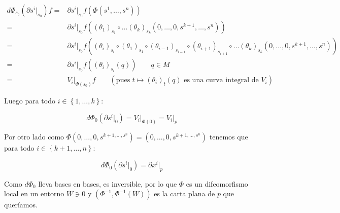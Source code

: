 \documentclass[11pt]{article}
\newcommand{\sett}[1]{\left\lbrace#1\right\rbrace}
\numberwithin{theorem}{subsection}
\newenvironment{proof}[1][Demostraci\'on]{\begin{trivlist}
		\item[\hskip \labelsep {\bfseries #1}]}{\end{trivlist}}
\newenvironment{definition}[1][Definici\'on]{\begin{trivlist}
		\item[\hskip \labelsep {\bfseries #1}]}{\end{trivlist}}
\newcommand{\qed}{\nobreak \ifvmode \relax \else
	\ifdim\lastskip<1.5em \hskip-\lastskip
	\hskip1.5em plus0em minus0.5em \fi \nobreak
	\vrule height0.75em width0.5em depth0.25em\fi}
\begin{document}
\begin{proof}
\begin{definition}
\begin{proof}
			\begin{equation*}
			\begin{aligned}
				d \Phi_{s_0} \left(\partial s^i \vert_{s_0}\right)f = & \partial s^i \vert_{s_0} f \left(\Phi(s^1, \dots, s^n)\right) \\
				= & \partial s^i \vert_{s_0} f \left((\theta_1)_{s_1} \circ \dots (\theta_k)_{s_k} (0, \dots, 0, s^{k+1}, \dots, s^n) \right) \\ 
				= & \partial s^i \vert_{s_0} f \left((\theta_i)_{s_i} \circ (\theta_1)_{s_1} \circ (\theta_{i-1})_{s_{i-1}}  \circ (\theta_{i+1})_{s_{i+1}} \circ  \dots (\theta_k)_{s_k} (0, \dots, 0, s^{k+1}, \dots, s^n) \right)  \\
				= & \partial s^i \vert_{s_0} f \left((\theta_i)_{s_i} (q) \right) \qquad q \in M \\
				= & V_i \vert_{\Phi(s_0)} f \qquad \left( \text{pues } t \mapsto (\theta_i)_t(q) \text{ es una curva integral de } V_i	\right)			
			\end{aligned}
			\end{equation*}
			
			Luego para todo $i \in \sett{1, \dots, k}$:
			
			\begin{equation}
				d \Phi_{0} \left(\partial s^i \vert_{0}\right) = V_i \vert_{\Phi(0)}  = V_i \vert_{p} 
			\end{equation}
			
			Por otro lado como $\Phi (0, \dots, 0, s^{k+1, \dots, s^n}) = (0, \dots, 0, s^{k+1, \dots, s^n})$ tenemos que para todo $i \in \sett{k+1, \dots, n}$:
			
			\begin{equation}
				d \Phi_{0} \left(\partial s^i \vert_{0}\right) = \partial x^{i} \vert_{p} 
			\end{equation}
			
			Como $d \Phi_{0}$ lleva bases en bases, es inversible, por lo que $\Phi$ es un difeomorfismo local en un entorno $W \ni 0$ y $(\Phi^{-1},\Phi^{-1} \left(W\right))$ es la carta plana de $p$ que quer\'iamos. \qed
			
		\end{proof}
		
	\end{definition}
	
\end{proof}
\end{document}
